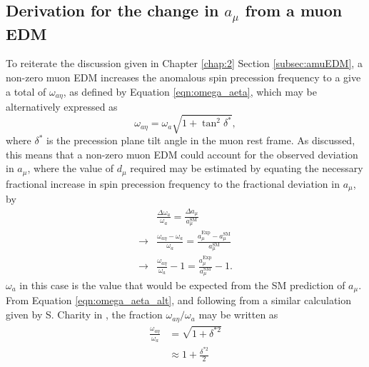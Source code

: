 
\begin{appendices}

\chapter[Derivation for the change in $a_{\mu}$ from a muon EDM]{Derivation for the change in $a_{\mu}$ from a muon EDM}\label{app:amuEDMDerivation}

To reiterate the discussion given in Chapter \ref{chap:2} Section \ref{subsec:amuEDM}, a non-zero muon EDM increases the anomalous spin precession frequency to a give a total of $\omega_{a\eta}$, as defined by Equation \ref{eqn:omega_aeta}, which may be alternatively expressed as 
%
\begin{equation}
  \omega_{a\eta} = \omega_{a}\sqrt{1+\tan^{2}\delta^{*}},
  \label{eqn:omega_aeta_alt}
\end{equation}
%
where $\delta^{*}$ is the precession plane tilt angle in the muon rest frame. As discussed, this means that a non-zero muon EDM could account for the observed deviation in $a_{\mu}$, where the value of $d_{\mu}$ required may be estimated by equating the necessary fractional increase in spin precession frequency to the fractional deviation in $a_{\mu}$, by
%
\begin{equation}
\begin{aligned}
  &\frac{\Delta \omega_{a}}{\omega_{a}} = \frac{\Delta a_{\mu}}{a_{\mu}^{\text{SM}}} \\    
  \rightarrow&\frac{\omega_{a\eta}-\omega_{a}}{\omega_{a}} = \frac{a_{\mu}^{\text{Exp}}-a_{\mu}^{\text{SM}}}{a_{\mu}^{\text{SM}}} \\
  \rightarrow&\frac{\omega_{a\eta}}{\omega_{a}} - 1 = \frac{a_{\mu}^{\text{Exp}}}{a_{\mu}^{\text{SM}}} - 1 .%
\end{aligned}
\label{eqn:FracIncrease}
\end{equation}
%
$\omega_{a}$ in this case is the value that would be expected from the SM prediction of $a_{\mu}$. From Equation \ref{eqn:omega_aeta_alt}, and following from a similar calculation given by S. Charity in \cite{Charity}, the fraction $\omega_{a\eta}/\omega_{a}$ may be written as
%
\begin{equation}
\begin{aligned} 
\frac{\omega_{a\eta}}{\omega_{a}} &= \sqrt{1+\delta^{*2}} \\ 
& \approx 1 + \frac{\delta^{*2}}{2} \\ 

\end{aligned}
\end{equation}
\end{appendices}
